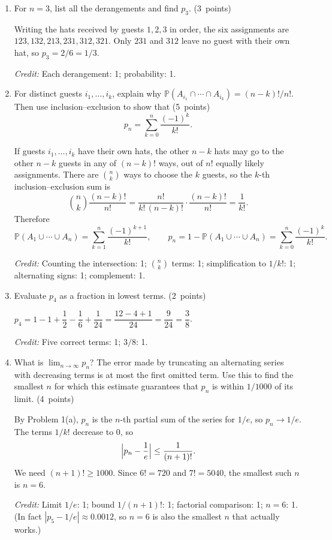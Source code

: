 \documentclass[11pt,letterpaper]{article}
\newcommand{\Prob}{\mathbb P}
\newcommand{\partpts}[1]{\unskip\nobreak\hspace{.3em}%
  \mbox{\small\color{muted}(#1 points)}}
\newcommand{\credit}[1]{\par{\footnotesize\color{muted}\textit{Credit:} #1}}
\begin{document}
\begin{enumerate}
  \item For $n=3$, list all the derangements and find $p_3$. \partpts{3}
  \begin{solution}[.8in]
    Writing the hats received by guests $1,2,3$ in order, the six assignments
    are $123,132,213,231,312,321$. Only $231$ and $312$ leave no guest with
    their own hat, so $p_3=2/6=1/3$.
    \credit{Each derangement: 1; probability: 1.}
  \end{solution}

  \item For distinct guests $i_1,\dots,i_k$, explain why
  $\Prob(A_{i_1}\cap\cdots\cap A_{i_k})=(n-k)!/n!$. Then use
  inclusion--exclusion to show that \partpts{5}
  \[
    p_n=\sum_{k=0}^{n}\frac{(-1)^k}{k!}.
  \]
  \begin{solution}[2.1in]
    If guests $i_1,\dots,i_k$ have their own hats, the other $n-k$ hats may go
    to the other $n-k$ guests in any of $(n-k)!$ ways, out of $n!$ equally
    likely assignments. There are $\binom nk$ ways to choose the $k$ guests,
    so the $k$-th inclusion--exclusion sum is
    \[
      \binom nk\frac{(n-k)!}{n!}=\frac{n!}{k!\,(n-k)!}\cdot\frac{(n-k)!}{n!}
      =\frac1{k!}.
    \]
    Therefore
    \[
      \Prob(A_1\cup\cdots\cup A_n)=\sum_{k=1}^n\frac{(-1)^{k+1}}{k!},
      \qquad
      p_n=1-\Prob(A_1\cup\cdots\cup A_n)=\sum_{k=0}^n\frac{(-1)^k}{k!}.
    \]
    \credit{Counting the intersection: 1; $\binom nk$ terms: 1; simplification
    to $1/k!$: 1; alternating signs: 1; complement: 1.}
  \end{solution}

  \item Evaluate $p_4$ as a fraction in lowest terms. \partpts{2}
  \begin{solution}[.7in]
    $p_4=1-1+\dfrac12-\dfrac16+\dfrac1{24}=\dfrac{12-4+1}{24}=\dfrac9{24}
    =\dfrac38$.
    \credit{Five correct terms: 1; $3/8$: 1.}
  \end{solution}

  \item What is $\lim_{n\to\infty}p_n$? The error made by truncating an
  alternating series with decreasing terms is at most the first omitted term.
  Use this to find the smallest $n$ for which this estimate guarantees that
  $p_n$ is within $1/1000$ of its limit. \partpts{4}
  \begin{solution}[1.35in]
    By Problem 1(a), $p_n$ is the $n$-th partial sum of the series for $1/e$,
    so $p_n\to1/e$. The terms $1/k!$ decrease to $0$, so
    \[
      \Bigl|p_n-\frac1e\Bigr|\le\frac1{(n+1)!}.
    \]
    We need $(n+1)!\ge1000$. Since $6!=720$ and $7!=5040$, the smallest such
    $n$ is $n=6$.
    \credit{Limit $1/e$: 1; bound $1/(n+1)!$: 1; factorial comparison: 1;
    $n=6$: 1.}
    {\footnotesize\color{muted}(In fact $|p_5-1/e|\approx0.0012$, so $n=6$ is
    also the smallest $n$ that actually works.)}
  \end{solution}


\end{enumerate}
\end{document}
